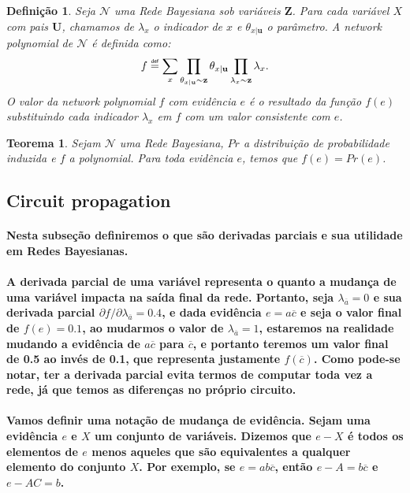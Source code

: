 \documentclass[a4paper,10pt]{article}
\newcommand\defeq{\mathrel{\overset{\makebox[0pt]{\mbox{\normalfont\tiny\sffamily def}}}{=}}}
\theoremstyle{plain}
\newtheorem*{spn-def}{Definição}
\newtheorem*{spn-thm}{Teorema}
\begin{document}
\begin{spn-def} Seja $\mathcal{N}$ uma Rede Bayesiana sob variáveis $\mathbf{Z}$. Para cada
variável $X$ com pais $\mathbf{U}$, chamamos de $\lambda_x$ o indicador de $x$ e
$\theta_{x|\textbf{u}}$ o parâmetro. A \textit{network polynomial} de $\mathcal{N}$ é definida como:
\begin{equation}
f \defeq \sum_x \prod_{\theta_{x|\textbf{u}} \sim \textbf{z}} \theta_{x|\textbf{u}} \prod_{\lambda_x \sim \textbf{z}} \lambda_x.
\end{equation}
O valor da \textit{network polynomial} $f$ com evidência $e$ é o resultado da função $f(e)$
substituindo cada indicador $\lambda_x$ em $f$ com um valor consistente com $e$.
\end{spn-def}

\begin{spn-thm} Sejam $\mathcal{N}$ uma Rede Bayesiana, $Pr$ a distribuição de probabilidade
induzida e $f$ a \textit{polynomial}. Para toda evidência $e$, temos que $f(e)=Pr(e)$.
\end{spn-thm}

\subsection{Circuit propagation}

\paragraph{
  Nesta subseção definiremos o que são derivadas parciais e sua utilidade em Redes Bayesianas.
}

\paragraph{
  A derivada parcial de uma variável representa o quanto a mudança de uma variável impacta na saída
final da rede. Portanto, seja $\lambda_{\overline{a}}=0$ e sua derivada parcial
$\partial{f}/\partial{\lambda_{\overline{a}}} = 0.4$, e dada evidência $e=a\overline{c}$ e seja o
valor final de $f(e)=0.1$, ao mudarmos o valor de $\lambda_{\overline{a}}=1$, estaremos na realidade
mudando a evidência de $a\overline{c}$ para $\overline{c}$, e portanto teremos um valor final de
0.5 ao invés de 0.1, que representa justamente $f(\overline{c})$. Como pode-se notar, ter a
derivada parcial evita termos de computar toda vez a rede, já que temos as diferenças no próprio
circuito.
}

\paragraph{
  Vamos definir uma notação de mudança de evidência. Sejam uma evidência $e$ e $X$ um conjunto
de variáveis. Dizemos que $e-X$ é todos os elementos de $e$ menos aqueles que são equivalentes a
qualquer elemento do conjunto $X$. Por exemplo, se $e=ab\overline{c}$, então $e-A=b\overline{c}$
e $e-AC=b$.
}
\end{document}
